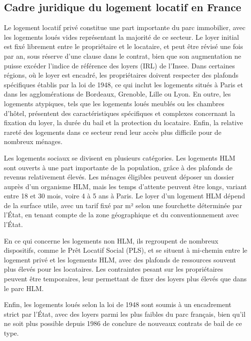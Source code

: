 \documentclass[a4paper, 12pt]{report}
\begin{document}
\subsection{Cadre juridique du logement locatif en France}

Le logement locatif privé constitue une part importante du parc immobilier, avec les logements loués vides représentant la majorité de ce secteur. Le loyer initial est fixé librement entre le propriétaire et le locataire, et peut être révisé une fois par an, sous réserve d'une clause dans le contrat, bien que son augmentation ne puisse excéder l'indice de référence des loyers (IRL) de l'Insee. Dans certaines régions, où le loyer est encadré, les propriétaires doivent respecter des plafonds spécifiques établis par la loi de 1948, ce qui inclut les logements situés à Paris et dans les agglomérations de Bordeaux, Grenoble, Lille ou Lyon. En outre, les logements atypiques, tels que les logements loués meublés ou les chambres d’hôtel, présentent des caractéristiques spécifiques et complexes concernant la fixation du loyer, la durée du bail et la protection du locataire. Enfin, la relative rareté des logements dans ce secteur rend leur accès plus difficile pour de nombreux ménages.

Les logements sociaux se divisent en plusieurs catégories. Les logements HLM sont ouverts à une part importante de la population, grâce à des plafonds de revenus relativement élevés. Les ménages éligibles peuvent déposer un dossier auprès d’un organisme HLM, mais les temps d’attente peuvent être longs, variant entre 18 et 30 mois, voire 4 à 5 ans à Paris. Le loyer d’un logement HLM dépend de la surface utile, avec un tarif fixé par m² selon une fourchette déterminée par l’État, en tenant compte de la zone géographique et du conventionnement avec l’État. 

En ce qui concerne les logements non HLM, ils regroupent de nombreux dispositifs, comme le Prêt Locatif Social (PLS), et se situent à mi-chemin entre le logement privé et les logements HLM, avec des plafonds de ressources souvent plus élevés pour les locataires. Les contraintes pesant sur les propriétaires peuvent être temporaires, leur permettant de fixer des loyers plus élevés que dans le parc HLM. 

Enfin, les logements loués selon la loi de 1948 sont soumis à un encadrement strict par l’État, avec des loyers parmi les plus faibles du parc français, bien qu'il ne soit plus possible depuis 1986 de conclure de nouveaux contrats de bail de ce type.
\end{document}
